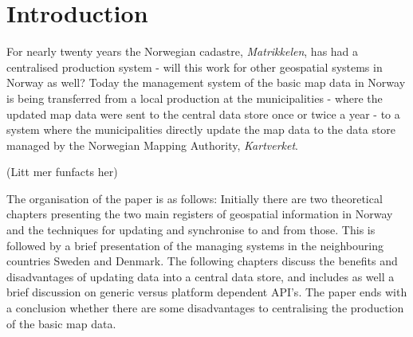 \chapter{Introduction}
For nearly twenty years the Norwegian cadastre, \textit{Matrikkelen}, has had a centralised production system - will this work for other geospatial systems in Norway as well? Today the management system of the basic map data in Norway is being transferred from a local production at the municipalities - where the updated map data were sent to the central data store once or twice a year - to a system where the municipalities directly update the map data to the data store managed by the Norwegian Mapping Authority, \textit{Kartverket}. 

(Litt mer funfacts her)



The organisation of the paper is as follows: Initially there are two theoretical chapters presenting the two main registers of geospatial information in Norway and the techniques for updating and synchronise to and from those. This is followed by a brief presentation of the managing systems in the neighbouring countries Sweden and Denmark. The following chapters discuss the benefits and disadvantages of updating data into a central data store, and includes as well a brief discussion on generic versus platform dependent API's. The paper ends with a conclusion whether there are some disadvantages to centralising the production of the basic map data.

